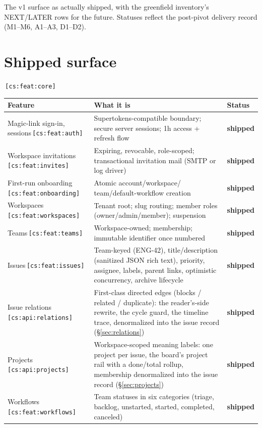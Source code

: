 \documentclass[11pt,a4paper]{report}
\newcommand{\cs}[1]{\,\texttt{\scriptsize[cs:#1]}\label{cs:#1}}
\newcommand{\csr}[1]{\,\texttt{\scriptsize[cs:#1]}}
\newcommand{\shipped}{\textbf{\textcolor{green!45!black}{shipped}}}
\begin{document}
The v1 surface as actually shipped, with the greenfield inventory's
NEXT/LATER rows for the future. Statuses reflect the post-pivot delivery
record (M1--M6, A1--A3, D1--D2).

\section{Shipped surface}
\cs{feat:core}

\begin{center}
\begin{longtable}{@{}p{}p{}l@{}}
\toprule
\textbf{Feature} & \textbf{What it is} & \textbf{Status}\\
\midrule
\endhead
Magic-link sign-in, sessions\cs{feat:auth} & Supertokens-compatible
  boundary; secure server sessions; 1h access + refresh flow & \shipped\\
Workspace invitations\cs{feat:invites} & Expiring, revocable,
  role-scoped; transactional invitation mail (SMTP or log driver) & \shipped\\
First-run onboarding\cs{feat:onboarding} & Atomic account/workspace/
  team/default-workflow creation & \shipped\\
Workspaces\cs{feat:workspaces} & Tenant root; slug routing; member
  roles (owner/admin/member); suspension & \shipped\\
Teams\cs{feat:teams} & Workspace-owned; membership; immutable
  identifier once numbered & \shipped\\
Issues\cs{feat:issues} & Team-keyed (ENG-42), title/description
  (sanitized JSON rich text), priority, assignee, labels, parent links,
  optimistic concurrency, archive lifecycle & \shipped\\
Issue relations\csr{api:relations} & First-class directed edges
  (blocks / related / duplicate): the reader's-side rewrite, the cycle
  guard, the timeline trace, denormalized into the issue record
  (\S\ref{sec:relations}) & \shipped\\
Projects\csr{api:projects} & Workspace-scoped meaning labels: one
  project per issue, the board's project rail with a done/total rollup,
  membership denormalized into the issue record
  (\S\ref{sec:projects}) & \shipped\\
Workflows\cs{feat:workflows} & Team statuses in six categories
  (triage, backlog, unstarted, started, completed, canceled) & \shipped\\

\end{longtable}
\end{center}
\end{document}
